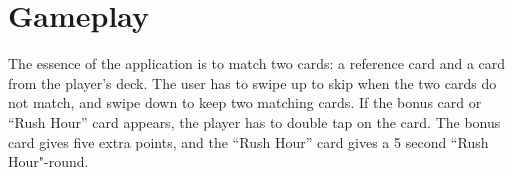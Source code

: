 \section{Gameplay}
The essence of the application is to match two cards: a reference card and a card from the player's deck. The user has to swipe up to skip when the two cards do not match, and swipe down to keep two matching cards. If the bonus card or “Rush Hour” card appears, the player has to double tap on the card. The bonus card gives five extra points, and the “Rush Hour” card gives a 5 second “Rush Hour"-round.

